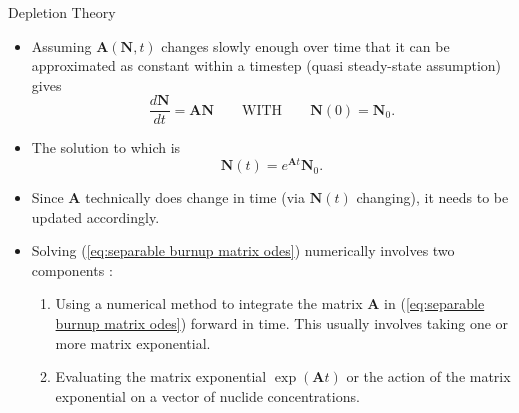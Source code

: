 \documentclass[9pt,t,aspectratio=169]{beamer}
\newcommand{\QWITH}{\qquad \text{WITH} \qquad}
\begin{document}
\begin{frame}{Depletion Theory}
    \pause
    \begin{itemize}
        \item<2-> Assuming $\textbf{A}(\textbf{N},t)$ changes slowly enough over time that it can be approximated as constant within a timestep (quasi steady-state assumption) gives
        \begin{equation} \label{eq:separable burnup matrix odes}
            \frac{d\textbf{N}}{dt} =
            \textbf{A} \textbf{N}
            \QWITH
            \textbf{N}(0) = \textbf{N}_{0}.
        \end{equation}
        \item<3-> The solution to which is
        \begin{equation} \label{eq:separation solution}
            \textbf{N}(t) = e^{\textbf{A}t} \textbf{N}_{0}.
        \end{equation}
        \item<4-> Since \textbf{A} technically does change in time (via $\textbf{N}(t)$ changing), it needs to be updated accordingly.
        \vspace*{0.4cm}
        \item<5-> Solving (\ref{eq:separable burnup matrix odes}) numerically involves two components \cite{romano-depletion-2021}:
        \begin{enumerate}
            \item<6-> Using a numerical method to integrate the matrix $\textbf{A}$ in (\ref{eq:separable burnup matrix odes}) forward in time. This usually involves taking one or more matrix exponential.
            \item<7-> Evaluating the matrix exponential $\exp(\textbf{A}t)$ or the action of the matrix exponential on a vector of nuclide concentrations.
        \end{enumerate}
    \end{itemize}
\end{frame}
\end{document}
